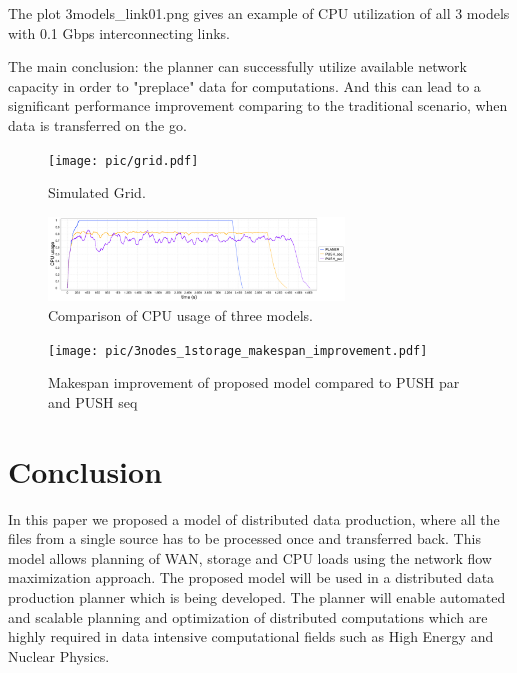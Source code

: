 \documentclass{svjour3}                     %
\begin{document}
The plot 3models\_link01.png gives an example of CPU utilization of all 3 models with 0.1 Gbps interconnecting links.

The main conclusion: the planner can successfully  utilize available network capacity in order to "preplace" data for computations. And this can lead to a significant performance improvement comparing to the traditional scenario, when data is transferred on the go. 

\begin{figure}[h]
  \begin{center}
    \texttt{[image: pic/grid.pdf]}
    \caption{Simulated Grid.}
  \end{center}  
  \label{simulated_grid}	
\end{figure}

\begin{figure}[h]
  \begin{center}
    \includegraphics [trim= 0mm 00mm 0mm 00mm , clip,       	width=0.7\textwidth]{pic/3models_link01.png}
    \caption{Comparison of CPU usage of three models. }
  \end{center}  
  \label{multi_cpu_consumption}	
\end{figure}

\begin{figure}[h]
  \begin{center}
    \texttt{[image: pic/3nodes\_1storage\_makespan\_improvement.pdf]}
    \caption{Makespan improvement of proposed model compared to PUSH par and PUSH seq}
  \end{center}  
  \label{multi_makespan_compare}	
\end{figure}


\section{Conclusion}
\label{Conclusion}

In this paper we proposed a model of distributed data production, where all
the files from a single source has to be processed once and transferred back.
This model allows planning of WAN, storage and CPU loads using the network
flow maximization approach. The proposed model will be used in a distributed
data production planner which is being developed. The planner will enable
automated and scalable planning and optimization of distributed computations
which are highly required in data intensive computational fields such as High Energy and Nuclear Physics.
\end{document}
